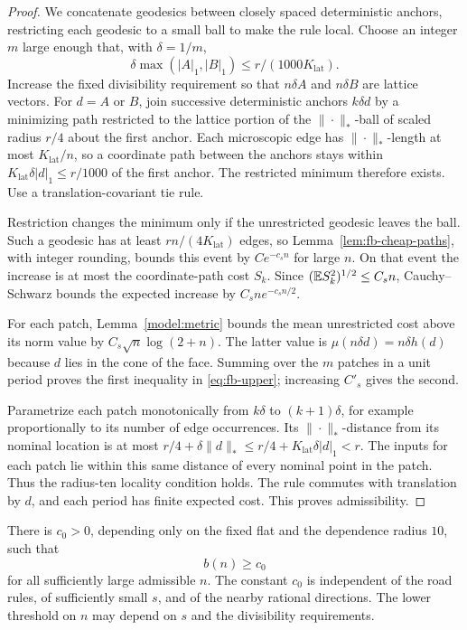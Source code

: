 \begin{proof}
We concatenate geodesics between closely spaced deterministic anchors,
restricting each geodesic to a small ball to make the rule local.
Choose an integer $m$ large enough that, with $\delta=1/m$,
\[
 \delta\max(|A|_1,|B|_1)\le r/(1000K_{\mathrm{lat}}).
\]
Increase the fixed divisibility requirement so that $n\delta A$ and
$n\delta B$ are lattice vectors.  For $d=A$ or $B$, join successive
deterministic anchors $k\delta d$ by a minimizing path restricted to
the lattice portion of the $\|\cdot\|_*$-ball of scaled radius $r/4$
about the first anchor.  Each microscopic edge has $\|\cdot\|_*$-length
at most $K_{\mathrm{lat}}/n$, so a coordinate path between the anchors stays within
$K_{\mathrm{lat}}\delta|d|_1\le r/1000$ of the first anchor.  The restricted minimum
therefore exists.  Use a translation-covariant tie rule.

Restriction changes the minimum only if the unrestricted geodesic
leaves the ball.  Such a geodesic has at least
$rn/(4K_{\mathrm{lat}})$ edges, so Lemma~\ref{lem:fb-cheap-paths},
with integer rounding, bounds this event by $Ce^{-c_s n}$ for large
$n$.  On that event the increase is at most the coordinate-path cost
$S_k$.  Since $(\mathbb E S_k^2)^{1/2}\le C_s n$, Cauchy--Schwarz
bounds the expected increase by $C_s n e^{-c_s n/2}$.

For each patch, Lemma~\ref{model:metric} bounds the mean unrestricted
cost above its norm value by $C_s\sqrt n\log(2+n)$.  The latter value
is $\mu(n\delta d)=n\delta h(d)$ because $d$ lies in the cone of the
face.  Summing over the $m$ patches in a unit period proves the first
inequality in \eqref{eq:fb-upper}; increasing $C'_s$ gives the second.

Parametrize each patch monotonically from $k\delta$ to
$(k+1)\delta$, for example proportionally to its number of edge
occurrences.  Its $\|\cdot\|_*$-distance from its nominal location is
at most $r/4+\delta\|d\|_*\le r/4+K_{\mathrm{lat}}\delta|d|_1<r$.
The inputs for each patch lie within this same distance of every
nominal point in the patch.  Thus the radius-ten locality condition
holds.  The rule commutes with translation by $d$, and each period
has finite expected cost.  This proves admissibility.
\end{proof}

\begin{proposition}
\label{prop:fb-positive}
There is $c_0>0$, depending only on the fixed flat and the dependence
radius $10$, such that
\begin{equation}
 b(n)\ge c_0
 \label{eq:fb-positive}
\end{equation}
for all sufficiently large admissible $n$.  The constant $c_0$ is
independent of the road rules, of sufficiently small $s$, and of the
nearby rational directions.  The lower threshold on $n$ may depend
on $s$ and the divisibility requirements.
\end{proposition}

